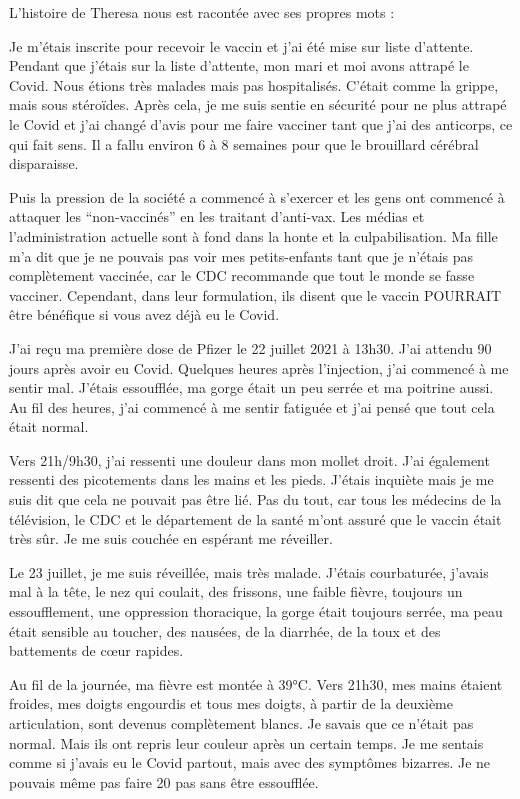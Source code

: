 L'histoire de Theresa nous est racontée avec ses propres mots :

Je m'étais inscrite pour recevoir le vaccin et j'ai été mise sur liste
d'attente. Pendant que j'étais sur la liste d'attente, mon mari et moi avons
attrapé le Covid. Nous étions très malades mais pas hospitalisés. C'était comme
la grippe, mais sous stéroïdes. Après cela, je me suis sentie en sécurité pour
ne plus attrapé le Covid et j'ai changé d'avis pour me faire vacciner tant que
j'ai des anticorps, ce qui fait sens. Il a fallu environ 6 à 8 semaines pour que
le brouillard cérébral disparaisse.

Puis la pression de la société a commencé à s'exercer et les gens ont commencé à
attaquer les “non-vaccinés” en les traitant d'anti-vax. Les médias et
l'administration actuelle sont à fond dans la honte et la culpabilisation. Ma
fille m'a dit que je ne pouvais pas voir mes petits-enfants tant que je n'étais
pas complètement vaccinée, car le CDC recommande que tout le monde se fasse
vacciner. Cependant, dans leur formulation, ils disent que le vaccin POURRAIT
être bénéfique si vous avez déjà eu le Covid.

J'ai reçu ma première dose de Pfizer le 22 juillet 2021 à 13h30. J'ai attendu 90
jours après avoir eu Covid. Quelques heures après l'injection, j'ai commencé à
me sentir mal. J'étais essoufflée, ma gorge était un peu serrée et ma poitrine
aussi. Au fil des heures, j'ai commencé à me sentir fatiguée et j'ai pensé que
tout cela était normal.

Vers 21h/9h30, j'ai ressenti une douleur dans mon mollet droit. J'ai également
ressenti des picotements dans les mains et les pieds. J'étais inquiète mais je
me suis dit que cela ne pouvait pas être lié. Pas du tout, car tous les médecins
de la télévision, le CDC et le département de la santé m'ont assuré que le
vaccin était très sûr. Je me suis couchée en espérant me réveiller.

Le 23 juillet, je me suis réveillée, mais très malade. J'étais courbaturée,
j'avais mal à la tête, le nez qui coulait, des frissons, une faible fièvre,
toujours un essoufflement, une oppression thoracique, la gorge était toujours
serrée, ma peau était sensible au toucher, des nausées, de la diarrhée, de la
toux et des battements de cœur rapides.

Au fil de la journée, ma fièvre est montée à 39°C. Vers 21h30, mes mains étaient
froides, mes doigts engourdis et tous mes doigts, à partir de la deuxième
articulation, sont devenus complètement blancs. Je savais que ce n'était pas
normal. Mais ils ont repris leur couleur après un certain temps. Je me sentais
comme si j'avais eu le Covid partout, mais avec des symptômes bizarres. Je ne
pouvais même pas faire 20 pas sans être essoufflée.

